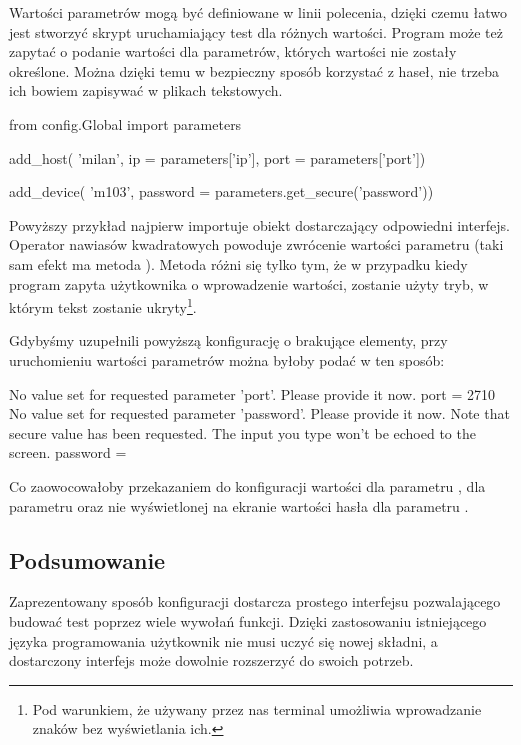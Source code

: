 \documentclass[00-praca-magisterska.tex]{subfiles}
\begin{document}
Wartości parametrów mogą być definiowane w linii polecenia, dzięki czemu łatwo
jest stworzyć skrypt uruchamiający test dla różnych wartości. Program może też
zapytać o podanie wartości dla parametrów, których wartości nie zostały
określone. Można dzięki temu w bezpieczny sposób korzystać z haseł, nie trzeba
ich bowiem zapisywać w plikach tekstowych.

\begin{pythoncode}
  from config.Global import parameters

  add_host(
      'milan',
      ip = parameters['ip'],
      port = parameters['port'])

  add_device(
      'm103',
      password = parameters.get_secure('password'))
\end{pythoncode}

Powyższy przykład najpierw importuje obiekt  dostarczający
odpowiedni interfejs. Operator nawiasów kwadratowych powoduje zwrócenie
wartości parametru  (taki sam efekt ma metoda ). Metoda
 różni się tylko tym, że w przypadku kiedy program zapyta
użytkownika o wprowadzenie wartości, zostanie użyty tryb, w którym tekst
zostanie ukryty\footnote{Pod warunkiem, że używany przez nas terminal umożliwia
wprowadzanie znaków bez wyświetlania ich.}.

Gdybyśmy uzupełnili powyższą konfigurację o brakujące elementy, przy
uruchomieniu wartości parametrów można byłoby podać w ten sposób:

\begin{textcode}
  No value set for requested parameter 'port'. Please provide it now.
  port = 2710
  No value set for requested parameter 'password'. Please provide it now.
  Note that secure value has been requested. The input you type won't be echoed
  to the screen.
  password = 
\end{textcode}

Co zaowocowałoby przekazaniem do konfiguracji wartości  dla
parametru ,  dla parametru  oraz nie
wyświetlonej na ekranie wartości hasła dla parametru .

\subsection{Podsumowanie}

Zaprezentowany sposób konfiguracji dostarcza prostego interfejsu pozwalającego
budować test poprzez wiele wywołań funkcji. Dzięki zastosowaniu istniejącego
języka programowania użytkownik nie musi uczyć się nowej składni, a dostarczony
interfejs może dowolnie rozszerzyć do swoich potrzeb.
\end{document}
